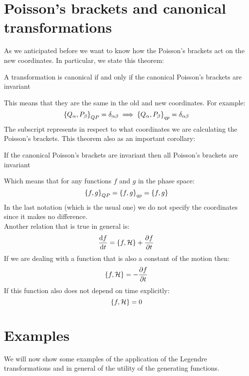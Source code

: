 \section{Poisson's brackets and canonical transformations}
As we anticipated before we want to know how the Poisson's brackets act on the new coordinates. In particular, we state this theorem:
\begin{theorem}
  A transformation is canonical if and only if the canonical Poisson's brackets are invariant
\end{theorem}
This means that they are the same in the old and new coordinates. For example:
\begin{equation}
    \left\{Q_{\alpha},P_{\beta}\right\}_{QP} = \delta_{\alpha \beta} \implies \left\{Q_{\alpha},P_{\beta}\right\}_{qp} = \delta_{\alpha \beta}
\end{equation}
The subscript represents in respect to what coordinates we are calculating the Poisson's brackets. This theorem also as an important corollary:
\begin{corollary}
    If the canonical Poisson's brackets are invariant then all Poisson's brackets are invariant
\end{corollary}
Which means that for any functions $f$ and $g$ in the phase space:
\begin{equation}
    \left\{f,g\right\}_{QP} = \left\{f,g\right\}_{qp} = \left\{f,g\right\}
\end{equation}
In the last notation (which is the usual one) we do not specify the coordinates since it makes no difference.\\
Another relation that is true in general is:
\begin{equation}
    \dfrac{\mathrm{d}f }{\mathrm{d}t} = \left\{f,\mathcal{H}\right\} + \dfrac{\partial f}{\partial t}
\end{equation}
If we are dealing with a function that is also a constant of the motion then:
\begin{equation}
    \left\{f,\mathcal{H}\right\} = - \dfrac{\partial f}{\partial t}
\end{equation}
If this function also does not depend on time explicitly:
\begin{equation}
    \left\{f,\mathcal{H}\right\} = 0
\end{equation}
\section{Examples}
We will now show some examples of the application of the Legendre transformations and in general of the utility of the generating functions.
